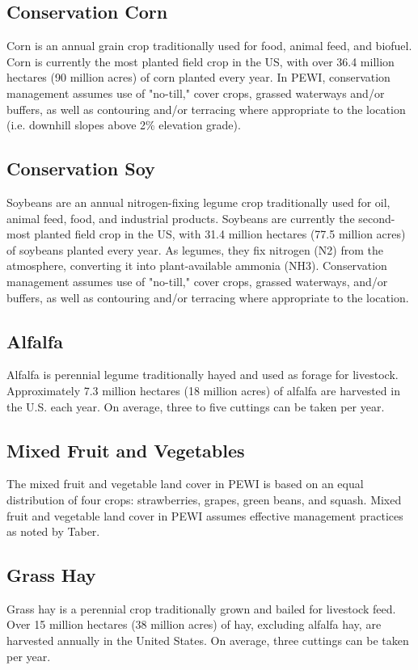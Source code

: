 \documentclass[11pt]{article}
\begin{document}
\subsection{Conservation Corn}
Corn is an annual grain crop traditionally used for food, animal feed, and biofuel. Corn is currently the most planted field crop in the US, with over 36.4 million hectares (90 million acres) of corn planted every year\cite{3}.  In PEWI, conservation management assumes use of "no-till," cover crops, grassed waterways and/or buffers, as well as contouring and/or terracing where appropriate to the location (i.e. downhill slopes above 2\% elevation grade).

\subsection{Conservation Soy}
Soybeans are an annual nitrogen-fixing legume crop traditionally used for oil, animal feed, food, and industrial products. Soybeans are currently the second-most planted field crop in the US, with 31.4 million hectares (77.5 million acres) of soybeans planted every year\cite{4}.  As legumes, they fix nitrogen (N2) from the atmosphere, converting it into plant-available ammonia (NH3). Conservation management assumes use of "no-till," cover crops, grassed waterways, and/or buffers, as well as contouring and/or terracing where appropriate to the location.

\subsection{Alfalfa}
Alfalfa is perennial legume traditionally hayed and used as forage for livestock. Approximately 7.3 million hectares (18 million acres) of alfalfa are harvested in the U.S. each year\cite{5}.  On average, three to five cuttings can be taken per year.

\subsection{Mixed Fruit and Vegetables}
The mixed fruit and vegetable land cover in PEWI is based on an equal distribution of four crops: strawberries, grapes, green beans, and squash. Mixed fruit and vegetable land cover in PEWI assumes effective management practices as noted by Taber.

\subsection{Grass Hay}
Grass hay is a perennial crop traditionally grown and bailed for livestock feed. Over 15 million hectares (38 million acres) of hay, excluding alfalfa hay, are harvested annually in the United States. On average, three cuttings can be taken per year.
\end{document}
